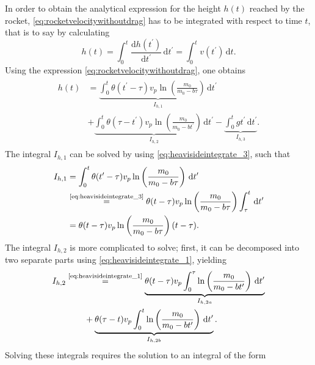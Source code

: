 \documentclass[a4paper,11pt]{report}
\begin{document}
In order to obtain the analytical expression for the height $h(t)$ reached by the rocket, \cref{eq:rocketvelocitywithoutdrag} has to be integrated with respect to time $t$, that is to say by calculating
\begin{equation}
h(t) = \int_{0}^{t} \frac{\mathrm{d}h(t^\prime)}{\mathrm{d}t^\prime}\,\mathrm{d}t^\prime = \int_{0}^{t}v(t^\prime)\,\mathrm{d}t.
\end{equation} Using the expression \cref{eq:rocketvelocitywithoutdrag}, one obtains \begin{align}\begin{aligned}
h(t) &= \underbrace{\int_{0}^{t}\theta(t^\prime-\tau)v_p\ln\left(\frac{m_0}{m_0-b\tau}\right)\,\mathrm{d}t^\prime}_{I_{h,1}} \\  &+ \underbrace{\int_{0}^{t}\theta(\tau-t^\prime)v_p\ln\left(\frac{m_0}{m_0-bt^\prime}\right)\,\mathrm{d}t^\prime}_{I_{h,2}} - \underbrace{\int_{0}^{t}gt^\prime\,\mathrm{d}t^\prime}_{I_{h,3}}.
\end{aligned}\end{align} The integral $I_{h,1}$ can be solved by using \cref{eq:heavisideintegrate_3}, such that \begin{align}\begin{aligned}
I_{h,1} &= \int_{0}^{t}\theta(t^\prime-\tau)v_p\ln\left(\frac{m_0}{m_0-b\tau}\right)\,\mathrm{d}t^\prime \\ &\overset{\text{\cref{eq:heavisideintegrate_3}}}{=} \theta(t-\tau)v_p\ln\left(\frac{m_0}{m_0-b\tau}\right)\int_{\tau}^{t}\,\mathrm{d}t^\prime \\
&= \theta(t-\tau)v_p\ln\left(\frac{m_0}{m_0-b\tau}\right)(t-\tau).
\end{aligned}\end{align} The integral $I_{h,2}$ is more complicated to solve; first, it can be decomposed into two separate parts using \cref{eq:heavisideintegrate_1}, yielding \begin{align}\begin{aligned}
I_{h,2} &\overset{\text{\cref{eq:heavisideintegrate_1}}}{=} \underbrace{\theta(t-\tau)v_p\int_{0}^{\tau}\ln\left(\frac{m_0}{m_0-bt^\prime}\right)\,\mathrm{d}t^\prime}_{I_{h,2a}} \\ &\qquad \, + \underbrace{\theta(\tau-t)v_p\int_{0}^{t}\ln\left(\frac{m_0}{m_0-bt^\prime}\right)\,\mathrm{d}t^\prime}_{I_{h,2b}}.
\end{aligned}\end{align} Solving these integrals requires the solution to an integral of the form \begin{align}\label{eq:solvehintegrals}

\end{align}
\end{document}
